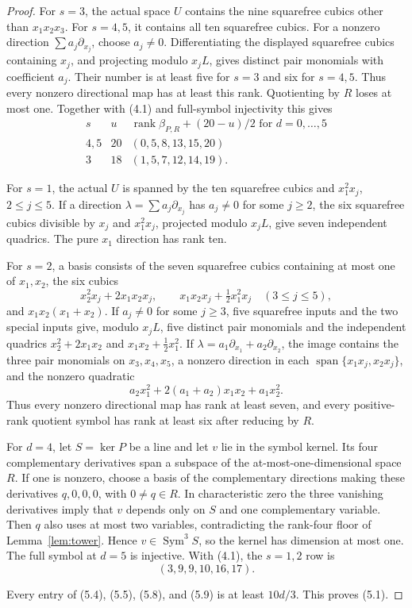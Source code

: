 \documentclass[11pt]{amsart}
\newcommand{\Sym}{\operatorname{Sym}}
\newcommand{\Span}{\operatorname{span}}
\newcommand{\rank}{\operatorname{rank}}
\theoremstyle{definition}
\begin{document}
\begin{proof}
For \(s=3\), the actual space \(U\) contains the nine squarefree cubics
other than \(x_1x_2x_3\). For \(s=4,5\), it contains all ten squarefree
cubics. For a nonzero direction \(\sum a_j\partial_{x_j}\), choose
\(a_j\ne0\). Differentiating the displayed squarefree cubics containing
\(x_j\), and projecting modulo \(x_jL\), gives distinct pair monomials
with coefficient \(a_j\). Their number is at least five for \(s=3\)
and six for \(s=4,5\). Thus every nonzero directional map has at least
this rank. Quotienting by \(R\) loses at most one.
Together with (4.1) and full-symbol injectivity this gives
\[
\begin{array}{c|c|c}
s&u&\rank\beta_{P,R}+(20-u)/2\text{ for }d=0,\ldots,5\\ \hline
4,5&20&(0,5,8,13,15,20)\\
3&18&(1,5,7,12,14,19).
\end{array} \tag{5.8}
\]

For \(s=1\), the actual \(U\) is spanned by the ten squarefree cubics and
\(x_1^2x_j\), \(2\le j\le5\). If a direction
\(\lambda=\sum a_j\partial_{x_j}\) has \(a_j\ne0\) for some \(j\ge2\),
the six squarefree cubics divisible by \(x_j\) and \(x_1^2x_j\), projected
modulo \(x_jL\), give seven independent quadrics. The pure \(x_1\)
direction has rank ten.

For \(s=2\), a basis consists of the seven squarefree cubics containing at
most one of \(x_1,x_2\), the six cubics
\[
 x_2^2x_j+2x_1x_2x_j,\qquad
 x_1x_2x_j+\tfrac12x_1^2x_j\quad(3\le j\le5),
\]
and \(x_1x_2(x_1+x_2)\). If \(a_j\ne0\) for some \(j\ge3\), five
squarefree inputs and the two special inputs give, modulo \(x_jL\), five
distinct pair monomials and the independent quadrics
\(x_2^2+2x_1x_2\) and \(x_1x_2+\tfrac12x_1^2\). If
\(\lambda=a_1\partial_{x_1}+a_2\partial_{x_2}\), the image contains the
three pair monomials on \(x_3,x_4,x_5\), a nonzero direction in each
\(\Span\{x_1x_j,x_2x_j\}\), and the nonzero quadratic
\[
 a_2x_1^2+2(a_1+a_2)x_1x_2+a_1x_2^2.
\]
Thus every nonzero directional map has rank at least seven, and every
positive-rank quotient symbol has rank at least six after reducing by \(R\).

For \(d=4\), let \(S=\ker P\) be a line and let \(v\) lie in the symbol
kernel. Its four complementary derivatives span a subspace of the
at-most-one-dimensional space \(R\). If one is nonzero, choose a basis
of the complementary directions making these derivatives \(q,0,0,0\),
with \(0\ne q\in R\). In characteristic zero the three vanishing
derivatives imply that \(v\) depends only on \(S\) and one complementary
variable. Then \(q\) also uses at most two variables, contradicting
the rank-four floor of Lemma~\ref{lem:tower}. Hence
\(v\in\Sym^3S\), so the kernel has dimension at most one. The full symbol at
\(d=5\) is injective. With (4.1), the \(s=1,2\) row is
\[
 (3,9,9,10,16,17). \tag{5.9}
\]

Every entry of (5.4), (5.5), (5.8), and (5.9) is at least \(10d/3\).
This proves (5.1).
\end{proof}
\end{document}
